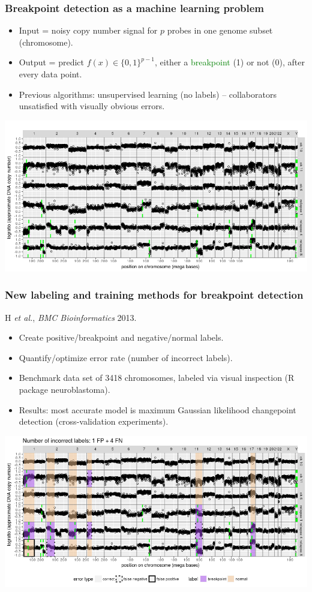 \documentclass{beamer}
\begin{document}
\begin{frame}
  \frametitle{Breakpoint detection as a machine learning problem}
  
  \begin{itemize}
  \item Input = noisy copy number signal for $p$ probes in one genome
    subset (chromosome).
  \item Output = predict $f(x)\in\{0,1\}^{p-1}$, either a
    \textcolor{green}{breakpoint} (1) or not (0),
    after every data point.
  \item Previous algorithms: unsupervised learning (no labels) --
    collaborators unsatisfied with visually obvious errors.
  \end{itemize}

  \includegraphics[width=\textwidth]{neuroblastoma-ok-relapse-pred}
\end{frame}

\begin{frame}
  \frametitle{New labeling and training methods for breakpoint detection}

  H {\it et al.}, {\it BMC Bioinformatics} 2013.
  \begin{itemize}
  \item Create positive/breakpoint and negative/normal labels.
  \item Quantify/optimize error rate (number of incorrect labels).
  \item Benchmark data set of 3418 chromosomes,
    labeled via visual inspection (R package neuroblastoma).
  \item Results: most accurate model is maximum Gaussian likelihood 
    changepoint detection (cross-validation experiments).
  \end{itemize}

  \includegraphics[width=\textwidth]{neuroblastoma-ok-relapse-supervised}

\end{frame}
\end{document}
